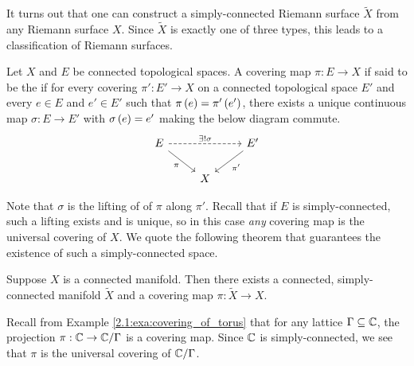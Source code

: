 \documentclass[../Moduli_Spaces_of_Riemann_Surfaces.tex]{subfiles}
\begin{document}
    \begin{remark}
        It turns out that one can construct a simply-connected Riemann surface $\tilde{X}$ from any Riemann surface $X$. Since $\tilde{X}$ is exactly one of three types, this leads to a classification of Riemann surfaces.\exqed
    \end{remark}
    \begin{definition}
        Let $X$ and $E$ be connected topological spaces. A covering map $\pi:E\to X$ if said to be the  if for every covering $\pi':E'\to X$ on a connected topological space $E'$ and every $e\in E$ and $e'\in E'$ such that $\pi\left(e\right)=\pi'\left(e'\right)$, there exists a unique continuous map $\sigma:E\to E'$ with $\sigma\left(e\right)=e'$ making the below diagram commute.
        \begin{equation*}
            \begin{tikzcd}
                E \ar[rr, "\ex!\sigma", dashed] \ar[dr, "\pi"'] & & E' \ar[dl, "\pi'"] \\
                                                    & X
            \end{tikzcd}
        \end{equation*}
    \end{definition}
    \vspace{-0.05in}
    \begin{remark}
        Note that $\sigma$ is the lifting of of $\pi$ along $\pi'$. Recall that if $E$ is simply-connected, such a lifting exists and is unique, so in this case \textit{any} covering map is the universal covering of $X$. We quote the following theorem that guarantees the existence of such a simply-connected space.\exqed
    \end{remark}
    \begin{theorem}
        Suppose $X$ is a connected manifold. Then there exists a connected, simply-connected manifold $\tilde{X}$ and a covering map $\pi:\tilde{X}\to X$.
    \end{theorem}
    \begin{example}
        Recall from Example \ref{2.1:exa:covering_of_torus} that for any lattice $\Gamma\subseteq\mathbb{C}$, the projection $\pi:\mathbb{C}\to\mathbb{C}/\Gamma$ is a covering map. Since $\mathbb{C}$ is simply-connected, we see that $\pi$ is the universal covering of $\mathbb{C}/\Gamma$.\exqed
    \end{example}
\end{document}
